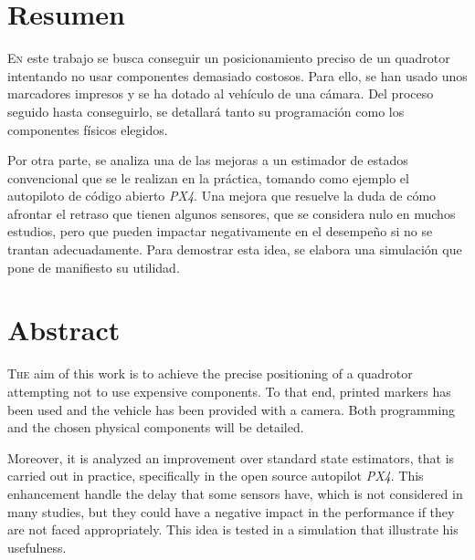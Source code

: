 \chapter*{Resumen}
\pagestyle{especial}
{}


\lettrine[lraise=-0.1, lines=2, loversize=0.2]{E}{n} este trabajo se busca conseguir un posicionamiento preciso de un quadrotor intentando no usar componentes demasiado costosos. Para ello, se han usado unos marcadores impresos y se ha dotado al vehículo de una cámara. Del proceso seguido hasta conseguirlo, se detallará tanto su programación como los componentes físicos elegidos.

Por otra parte, se analiza una de las mejoras a un estimador de estados convencional que se le realizan en la práctica, tomando como ejemplo el autopiloto de código abierto \textit{PX4}. Una mejora que resuelve la duda de cómo afrontar el retraso que tienen algunos sensores, que se considera nulo en muchos estudios, pero que pueden impactar negativamente en el desempeño si no se trantan adecuadamente. Para demostrar esta idea, se elabora una simulación que pone de manifiesto su utilidad. 

 


\chapter*{Abstract}
\pagestyle{especial}
{}

\lettrine[lraise=-0.1, lines=2, loversize=0.2]{T}{he} aim of this work is to achieve the precise positioning of a quadrotor attempting not to use expensive components. To that end, printed markers has been used and the vehicle has been provided with a camera. Both programming and the chosen physical components will be detailed.

Moreover, it is analyzed an improvement over standard state estimators, that is carried out in practice, specifically in the open source autopilot \textit{PX4}. This enhancement handle the delay that some sensors have, which is not considered in many studies, but they could have a negative impact in the performance if they are not faced appropriately. This idea is tested in a simulation that illustrate his usefulness.

